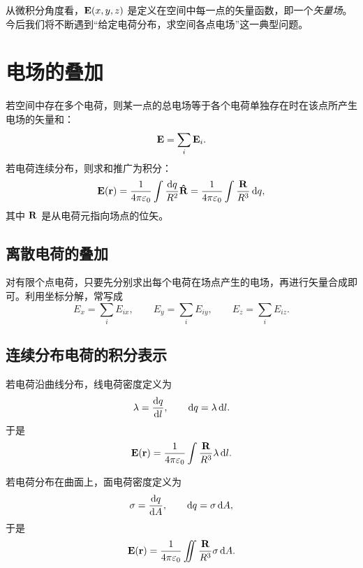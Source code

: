 从微积分角度看，$\vb{E}(x,y,z)$ 是定义在空间中每一点的矢量函数，即一个\emph{矢量场}。今后我们将不断遇到“给定电荷分布，求空间各点电场”这一典型问题。

\section{电场的叠加}

\begin{theorem}[电场叠加原理]
若空间中存在多个电荷，则某一点的总电场等于各个电荷单独存在时在该点所产生电场的矢量和：
\begin{equation}
\vb{E} = \sum_i \vb{E}_i.
\end{equation}
若电荷连续分布，则求和推广为积分：
\begin{equation}
\vb{E}(\vb{r}) = \frac{1}{4\pi\varepsilon_0}\int \frac{\dd q}{R^2}\vu{R}
= \frac{1}{4\pi\varepsilon_0}\int \frac{\vb{R}}{R^3}\,\dd q,
\end{equation}
其中 $\vb{R}$ 是从电荷元指向场点的位矢。
\end{theorem}

\subsection*{离散电荷的叠加}

对有限个点电荷，只要先分别求出每个电荷在场点产生的电场，再进行矢量合成即可。利用坐标分解，常写成
\begin{equation}
E_x = \sum_i E_{ix}, \qquad E_y = \sum_i E_{iy}, \qquad E_z = \sum_i E_{iz}.
\end{equation}

\subsection*{连续分布电荷的积分表示}

若电荷沿曲线分布，线电荷密度定义为
\begin{equation}
\lambda = \dv{q}{l}, \qquad \dd q = \lambda\,\dd l.
\end{equation}
于是
\begin{equation}
\vb{E}(\vb{r}) = \frac{1}{4\pi\varepsilon_0}\int \frac{\vb{R}}{R^3}\lambda\,\dd l.
\end{equation}

若电荷分布在曲面上，面电荷密度定义为
\begin{equation}
\sigma = \dv{q}{A}, \qquad \dd q = \sigma\,\dd A,
\end{equation}
于是
\begin{equation}
\vb{E}(\vb{r}) = \frac{1}{4\pi\varepsilon_0}\iint \frac{\vb{R}}{R^3}\sigma\,\dd A.
\end{equation}

